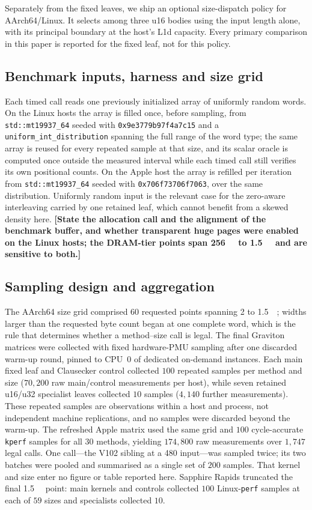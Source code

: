 \documentclass[fleqn,10pt]{wlscirep}
\begin{document}
Separately from the fixed leaves, we ship an optional size-dispatch policy for AArch64/Linux. It selects among three u16 bodies using the input length alone, with its principal boundary at the host's L1d capacity. Every primary comparison in this paper is reported for the fixed leaf, not for this policy.

\subsection*{Benchmark inputs, harness and size grid}
Each timed call reads one previously initialized array of uniformly random words. On the Linux hosts the array is filled once, before sampling, from \texttt{std::mt19937\_64} seeded with \texttt{0x9e3779b97f4a7c15} and a \texttt{uniform\_int\_distribution} spanning the full range of the word type; the same array is reused for every repeated sample at that size, and its scalar oracle is computed once outside the measured interval while each timed call still verifies its own positional counts. On the Apple host the array is refilled per iteration from \texttt{std::mt19937\_64} seeded with \texttt{0x706f73706f7063}, over the same distribution. Uniformly random input is the relevant case for the zero-aware interleaving carried by one retained leaf, which cannot benefit from a skewed density here. \textbf{[State the allocation call and the alignment of the benchmark buffer, and whether transparent huge pages were enabled on the Linux hosts; the DRAM-tier points span \SI{256}{\mebi\byte} to \SI{1.5}{\gibi\byte} and are sensitive to both.]}

\subsection*{Sampling design and aggregation}
The AArch64 size grid comprised $60$ requested points spanning \SI{2}{\byte} to \SI{1.5}{\gibi\byte}; widths larger than the requested byte count began at one complete word, which is the rule that determines whether a method--size call is legal. The final Graviton matrices were collected with fixed hardware-PMU sampling after one discarded warm-up round, pinned to CPU~0 of dedicated on-demand instances. Each main fixed leaf and Clausecker control collected $100$ repeated samples per method and size ($70{,}200$ raw main/control measurements per host), while seven retained u16/u32 specialist leaves collected $10$ samples ($4{,}140$ further measurements). These repeated samples are observations within a host and process, not independent machine replications, and no samples were discarded beyond the warm-up. The refreshed Apple matrix used the same grid and $100$ cycle-accurate \texttt{kperf} samples for all $30$ methods, yielding $174{,}800$ raw measurements over $1{,}747$ legal calls. One call---the V102 sibling at a \SI{480}{\byte} input---was sampled twice; its two batches were pooled and summarised as a single set of $200$ samples. That kernel and size enter no figure or table reported here. Sapphire Rapids truncated the final \SI{1.5}{\gibi\byte} point: main kernels and controls collected $100$ Linux-\texttt{perf} samples at each of $59$ sizes and specialists collected $10$.
\end{document}

